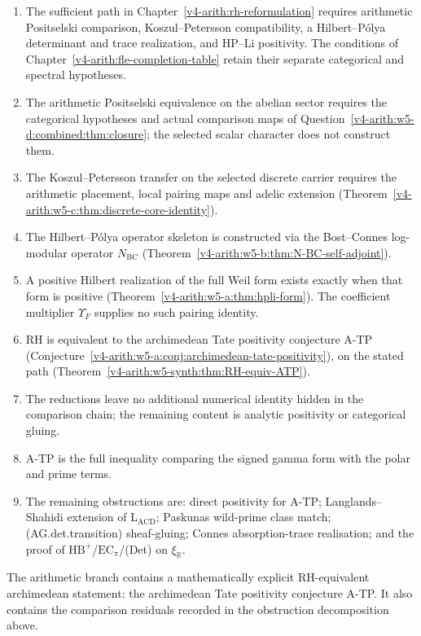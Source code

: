 \begin{enumerate}
\item The sufficient path in
Chapter~\ref{v4-arith:rh-reformulation} requires arithmetic Positselski
comparison, Koszul--Petersson compatibility, a Hilbert--P\'olya
determinant and trace realization, and HP--Li positivity. The conditions
of Chapter~\ref{v4-arith:fle-completion-table} retain their separate
categorical and spectral hypotheses.
\item The arithmetic Positselski equivalence on the abelian sector
requires the categorical hypotheses and actual comparison maps of
Question~\ref{v4-arith:w5-d:combined:thm:closure}; the selected scalar character
does not construct them.
\item The Koszul--Petersson transfer on the selected discrete carrier
requires the arithmetic placement, local pairing maps and adelic extension
(Theorem~\ref{v4-arith:w5-c:thm:discrete-core-identity}).
\item The Hilbert--P\'{o}lya operator skeleton is constructed via the
Bost--Connes log-modular operator
\(N_{\mathrm{BC}}\) (Theorem~\ref{v4-arith:w5-b:thm:N-BC-self-adjoint}).
\item A positive Hilbert realization of the full Weil form exists
exactly when that form is positive
(Theorem~\ref{v4-arith:w5-a:thm:hpli-form}). The coefficient multiplier
\(\Upsilon_F\) supplies no such pairing identity.
\item RH is equivalent to the archimedean Tate positivity conjecture
A-TP (Conjecture~\ref{v4-arith:w5-a:conj:archimedean-tate-positivity}),
on the stated path
(Theorem~\ref{v4-arith:w5-synth:thm:RH-equiv-ATP}).
\item The reductions leave no additional numerical identity hidden in
the comparison chain; the remaining content is analytic positivity or
categorical gluing.
\item A-TP is the full inequality comparing the signed gamma form with
the polar and prime terms.
\item The remaining obstructions are: direct positivity for A-TP;
Langlands--Shahidi extension of \(\mathrm{L}_{\mathrm{ACD}}\);
Paskunas wild-prime class match; (AG.det.transition) sheaf-gluing;
Connes absorption-trace realisation; and the proof of
\(\mathrm{HB}^{+}\)/\(\mathrm{EC}_\pi\)/(Det) on \(\xi_{\mathbb{R}}\).
\end{enumerate}

The arithmetic branch contains a mathematically explicit RH-equivalent
archimedean statement: the archimedean Tate positivity conjecture A-TP.
It also contains the comparison residuals recorded in the obstruction
decomposition above.

